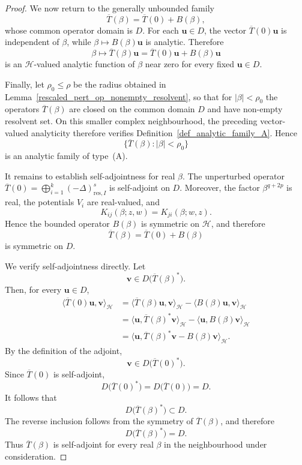 \documentclass[preprint,12pt]{elsarticle}
\newcommand{\fvect}[1]{\mathbf{#1}}
\begin{document}
\begin{proof}
We now return to the generally unbounded family
\[
    \overline{T}(\beta)
    =
    \overline{T}(0)+B(\beta),
\]
whose common operator domain is $D$. For each
$\fvect{u}\in D$, the vector $\overline{T}(0)\fvect{u}$ is independent
of $\beta$, while $\beta\mapsto B(\beta)\fvect{u}$ is analytic.
Therefore
\[
    \beta\longmapsto
    \overline{T}(\beta)\fvect{u}
    =
    \overline{T}(0)\fvect{u}
    +
    B(\beta)\fvect{u}
\]
is an $\mathcal H$-valued analytic function of $\beta$ near zero for every fixed
$\fvect{u}\in D$.

Finally, let $\rho_0\leq\rho$ be the radius obtained in
Lemma~\ref{rescaled_pert_op_nonempty_resolvent}, so that for
$|\beta|<\rho_0$ the operators $\overline{T}(\beta)$ are closed on the
common domain $D$ and have non-empty resolvent set. On this smaller
complex neighbourhood, the preceding vector-valued analyticity
therefore verifies Definition~\ref{def_analytic_family_A}. Hence
\[
    \bigl\{\overline{T}(\beta):|\beta|<\rho_0\bigr\}
\]
is an analytic family of type~(A).

It remains to establish self-adjointness for real $\beta$. The
unperturbed operator $\overline{T}(0)=\bigoplus_{i=1}^k(-\Delta)^s_{\mathrm{res},I}$ is self-adjoint on $D$. Moreover, the factor $\beta^{q+2p}$ is real, the potentials $V_i$ are real-valued, and
\[
    K_{ij}(\beta;z,w)
    =
    K_{ji}(\beta;w,z).
\]
Hence the bounded operator $B(\beta)$ is symmetric on $\mathcal H$,
and therefore
\[
    \overline T(\beta)
    =
    \overline T(0)+B(\beta)
\]
is symmetric on $D$.

We verify self-adjointness directly. Let
\[
    \fvect{v}\in D\bigl(\overline T(\beta)^*\bigr).
\]
Then, for every $\fvect{u}\in D$,
\[
\begin{aligned}
    \langle \overline T(0)\fvect{u},\fvect{v}\rangle_{\mathcal H}
    &=
    \langle \overline T(\beta)\fvect{u},\fvect{v}\rangle_{\mathcal H}
    -
    \langle B(\beta)\fvect{u},\fvect{v}\rangle_{\mathcal H}\\
    &=
    \langle \fvect{u},
        \overline T(\beta)^*\fvect{v}\rangle_{\mathcal H}
    -
    \langle \fvect{u},B(\beta)\fvect{v}\rangle_{\mathcal H}\\
    &=
    \langle \fvect{u},
        \overline T(\beta)^*\fvect{v}
        -
        B(\beta)\fvect{v}\rangle_{\mathcal H}.
\end{aligned}
\]
By the definition of the adjoint,
\[
    \fvect{v}\in D\bigl(\overline T(0)^*\bigr).
\]
Since $\overline T(0)$ is self-adjoint,
\[
    D\bigl(\overline T(0)^*\bigr)
    =
    D\bigl(\overline T(0)\bigr)
    =
    D.
\]
It follows that
\[
    D\bigl(\overline T(\beta)^*\bigr)\subset D.
\]
The reverse inclusion follows from the symmetry of
$\overline T(\beta)$, and therefore
\[
    D\bigl(\overline T(\beta)^*\bigr)=D.
\]
Thus $\overline T(\beta)$ is self-adjoint for every real $\beta$ in the neighbourhood under consideration.
\end{proof}
\end{document}

